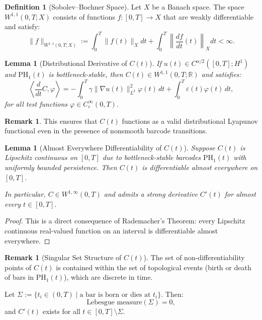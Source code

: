 \documentclass[11pt]{article}
\newtheorem{lemma}[theorem]{Lemma}
\theoremstyle{definition}
\newtheorem{definition}[theorem]{Definition}
\newtheorem{remark}[theorem]{Remark}
\begin{document}
\begin{definition}[Sobolev--Bochner Space]
Let $X$ be a Banach space. The space $W^{1,1}(0,T; X)$ consists of functions $f: [0,T] \to X$ that are weakly differentiable and satisfy:
\[
\|f\|_{W^{1,1}(0,T; X)} := \int_0^T \|f(t)\|_X dt + \int_0^T \left\|\frac{df}{dt}(t)\right\|_X dt < \infty.
\]
\end{definition}

\begin{lemma}[Distributional Derivative of $C(t)$]
If $u(t) \in C^{\alpha/2}([0,T]; H^1)$ and $\mathrm{PH}_1(t)$ is bottleneck-stable, then $C(t) \in W^{1,1}(0,T; \mathbb{R})$ and satisfies:
\[
\left\langle \frac{d}{dt} C, \varphi \right\rangle = -\int_0^T \gamma \|\nabla u(t)\|_{L^2}^2 \varphi(t)\, dt + \int_0^T \varepsilon(t) \varphi(t)\, dt,
\]
for all test functions $\varphi \in C_c^\infty(0,T)$.
\end{lemma}

\begin{remark}
This ensures that $C(t)$ functions as a valid distributional Lyapunov functional even in the presence of nonsmooth barcode transitions.
\end{remark}

\begin{lemma}[Almost Everywhere Differentiability of $C(t)$]
\label{lem:Ct_rademacher}
Suppose $C(t)$ is Lipschitz continuous on $[0,T]$ due to bottleneck-stable barcodes $\mathrm{PH}_1(t)$ with uniformly bounded persistence. Then $C(t)$ is differentiable almost everywhere on $[0,T]$.

In particular, $C \in W^{1,\infty}(0,T)$ and admits a strong derivative $C'(t)$ for almost every $t \in [0,T]$.
\end{lemma}

\begin{proof}
This is a direct consequence of Rademacher's Theorem: every Lipschitz continuous real-valued function on an interval is differentiable almost everywhere.
\end{proof}

\begin{remark}[Singular Set Structure of $C(t)$]
The set of non-differentiability points of $C(t)$ is contained within the set of topological events (birth or death of bars in $\mathrm{PH}_1(t)$), which are discrete in time.

Let $\Sigma := \{ t_i \in (0,T) \mid \text{a bar is born or dies at } t_i \}$. Then:
\[
\text{Lebesgue measure}(\Sigma) = 0,
\]
and $C'(t)$ exists for all $t \in [0,T] \setminus \Sigma$.
\end{remark}
\end{document}
